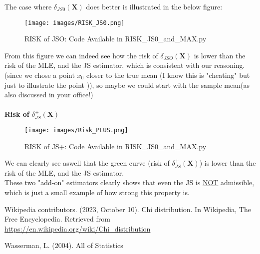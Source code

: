 \documentclass[12pt]{article}
\begin{document}
The case where $\delta_{JS0}(\boldsymbol{X})$ does better is illustrated in the below figure:
\begin{figure}[H]
  \centering 
  \texttt{[image: images/RISK\_JS0.png]}
  \caption{RISK of JSO: Code Available in RISK\_JS0\_and\_MAX.py}
  \label{fig:jso_2}
\end{figure}
From this figure we can indeed see how the risk of $\delta_{JSO}(\boldsymbol{X})$ is lower than the risk of the MLE, and the JS estimator, which is consistent with our reasoning.(since we chose a point $x_0$ closer to the true mean (I know this is "cheating" but just to illustrate the point )), so maybe we could start with the sample mean(as also discussed in your office!) \\ \\ 
\textbf{Risk of $\delta_{JS}^+(\boldsymbol{X})$}\\
\begin{figure}[H]
  \centering 
  \texttt{[image: images/Risk\_PLUS.png]}
  \caption{RISK of JS+: Code Available in RISK\_JS0\_and\_MAX.py}
  \label{fig:js+}
\end{figure}
We can clearly see aswell that the green curve (risk of $\delta_{JS}^+(\boldsymbol{X})$) is lower than the risk of the MLE, and the JS estimator. \\
These two "add-on" estimators clearly shows that even the JS is \underline{NOT} admissible, which is just a small example of how strong this property is.\\



\begin{thebibliography}{9}

Wikipedia contributors. (2023, October 10). Chi distribution. In Wikipedia, The Free Encyclopedia. Retrieved from \url{https://en.wikipedia.org/wiki/Chi_distribution}

Wasserman, L. (2004). All of Statistics
\end{thebibliography}
\end{document}
